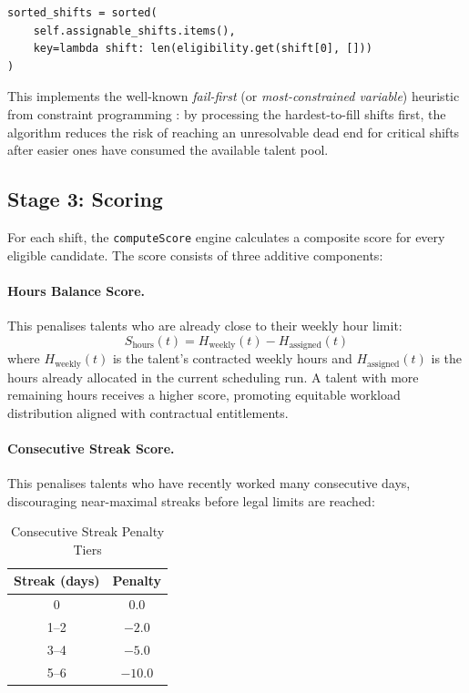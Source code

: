 \begin{lstlisting}[caption={Least-flexible-first shift ordering}, label={lst:lffo}]
sorted_shifts = sorted(
    self.assignable_shifts.items(),
    key=lambda shift: len(eligibility.get(shift[0], []))
)
\end{lstlisting}

This implements the well-known \textit{fail-first} (or \textit{most-constrained variable}) heuristic from constraint programming \cite{rossi_et_al_2006}: by processing the hardest-to-fill shifts first, the algorithm reduces the risk of reaching an unresolvable dead end for critical shifts after easier ones have consumed the available talent pool.

\subsection{Stage 3: Scoring}

For each shift, the \texttt{computeScore} engine calculates a composite score for every eligible candidate. The score consists of three additive components:

\paragraph{Hours Balance Score.} This penalises talents who are already close to their weekly hour limit:
\[
S_{\text{hours}}(t) = H_{\text{weekly}}(t) - H_{\text{assigned}}(t)
\]
where $H_{\text{weekly}}(t)$ is the talent's contracted weekly hours and $H_{\text{assigned}}(t)$ is the hours already allocated in the current scheduling run. A talent with more remaining hours receives a higher score, promoting equitable workload distribution aligned with contractual entitlements.

\paragraph{Consecutive Streak Score.} This penalises talents who have recently worked many consecutive days, discouraging near-maximal streaks before legal limits are reached:

\begin{table}[H]
\centering
\caption{Consecutive Streak Penalty Tiers}
\label{tab:streak}
\begin{tabular}{cc}
\toprule
\textbf{Streak (days)} & \textbf{Penalty} \\
\midrule
0   & $0.0$ \\
1--2 & $-2.0$ \\
3--4 & $-5.0$ \\
5--6 & $-10.0$ \\
\bottomrule
\end{tabular}
\end{table}

